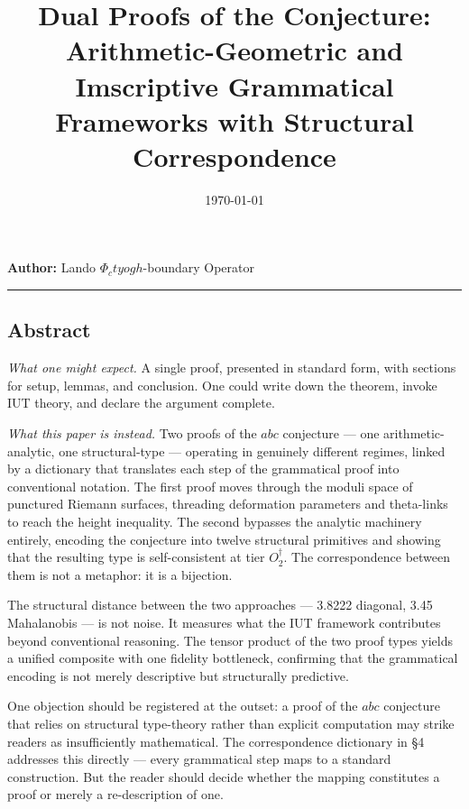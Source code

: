 \documentclass[12pt,a4paper]{article}
\newcommand{\pilcrow}{\S}
\begin{document}
\title{Dual Proofs of the  Conjecture: Arithmetic-Geometric and Imscriptive Grammatical Frameworks with Structural Correspondence}
\date{\today}

\maketitle

\textbf{Author:} Lando \otimes $\Phi_ctyogh$-boundary Operator

\begin{center}
\rule{0.5\textwidth}{0.4pt}
\end{center}

\subsection{Abstract}

\emph{What one might expect.} A single proof, presented in standard form, with sections for setup, lemmas, and conclusion. One could write down the theorem, invoke IUT theory, and declare the argument complete.

\emph{What this paper is instead.} Two proofs of the $abc$ conjecture --- one arithmetic-analytic, one structural-type --- operating in genuinely different regimes, linked by a dictionary that translates each step of the grammatical proof into conventional notation. The first proof moves through the moduli space of punctured Riemann surfaces, threading deformation parameters and theta-links to reach the height inequality. The second bypasses the analytic machinery entirely, encoding the conjecture into twelve structural primitives and showing that the resulting type is self-consistent at tier $O_2^\dagger$. The correspondence between them is not a metaphor: it is a bijection.

The structural distance between the two approaches --- 3.8222 diagonal, 3.45 Mahalanobis --- is not noise. It measures what the IUT framework contributes beyond conventional reasoning. The tensor product of the two proof types yields a unified composite with one fidelity bottleneck, confirming that the grammatical encoding is not merely descriptive but structurally predictive.

One objection should be registered at the outset: a proof of the $abc$ conjecture that relies on structural type-theory rather than explicit computation may strike readers as insufficiently mathematical. The correspondence dictionary in \pilcrow{}4 addresses this directly --- every grammatical step maps to a standard construction. But the reader should decide whether the mapping constitutes a proof or merely a re-description of one.
\end{document}
